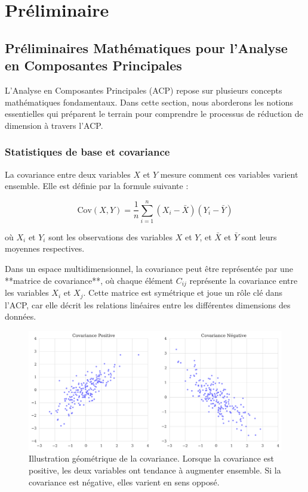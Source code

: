 \documentclass[a4paper,12pt]{report}
\begin{document}
\newpage
\chapter{Préliminaire}
\section{Préliminaires Mathématiques pour l'Analyse en Composantes Principales}

L'Analyse en Composantes Principales (ACP) repose sur plusieurs concepts mathématiques fondamentaux. Dans cette section, nous aborderons les notions essentielles qui préparent le terrain pour comprendre le processus de réduction de dimension à travers l'ACP.

\subsection{Statistiques de base et covariance}

La covariance entre deux variables \( X \) et \( Y \) mesure comment ces variables varient ensemble. Elle est définie par la formule suivante :

\[
\text{Cov}(X, Y) = \frac{1}{n} \sum_{i=1}^n (X_i - \bar{X})(Y_i - \bar{Y})
\]

où \( X_i \) et \( Y_i \) sont les observations des variables \( X \) et \( Y \), et \( \bar{X} \) et \( \bar{Y} \) sont leurs moyennes respectives.

Dans un espace multidimensionnel, la covariance peut être représentée par une **matrice de covariance**, où chaque élément \( C_{ij} \) représente la covariance entre les variables \( X_i \) et \( X_j \). Cette matrice est symétrique et joue un rôle clé dans l’ACP, car elle décrit les relations linéaires entre les différentes dimensions des données.

\begin{figure}[H]
    \includegraphics[width=1\textwidth]{covariance_illustration.png} 
    \caption{Illustration géométrique de la covariance. Lorsque la covariance est positive, les deux variables ont tendance à augmenter ensemble. Si la covariance est négative, elles varient en sens opposé.}
    \label{fig:covariance}
\end{figure}
\end{document}
